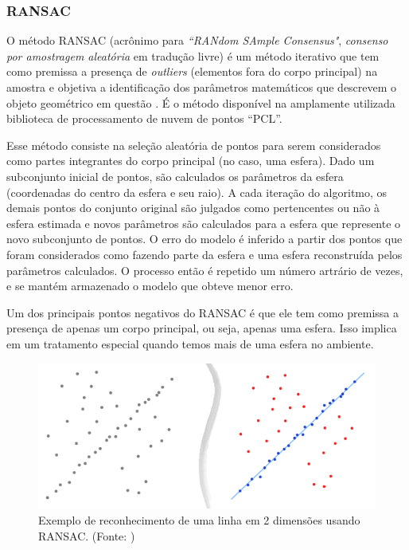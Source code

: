 \subsubsection{RANSAC}
O método RANSAC (acrônimo para \textit{``RANdom SAmple Consensus"},
\textit{consenso por amostragem aleatória} em tradução livre) é um método iterativo que tem como
premissa a presença de \textit{outliers} (elementos fora do corpo principal) na
amostra e objetiva a identificação dos parâmetros matemáticos que descrevem o
objeto geométrico em questão \cite{ransac}. É o método
disponível na amplamente utilizada biblioteca de processamento de nuvem de pontos ``PCL''. 


Esse método consiste na seleção aleatória de pontos para serem considerados como
partes integrantes do corpo principal (no caso, uma esfera). Dado um subconjunto
inicial de pontos, são calculados os parâmetros da esfera (coordenadas do centro
da esfera e seu raio). A cada iteração do algoritmo, os demais pontos do
conjunto original são julgados como pertencentes ou não à esfera estimada e
novos parâmetros são calculados para a esfera que represente o novo subconjunto
de pontos. O erro do modelo é inferido
a partir dos pontos que foram considerados como fazendo parte da esfera e uma esfera reconstruída pelos parâmetros calculados. O processo
então é repetido um número artrário de vezes, e se mantém armazenado o modelo
que obteve menor erro.

Um dos principais pontos negativos do RANSAC é que ele tem como premissa a
presença de apenas um corpo principal, ou seja, apenas uma esfera. Isso implica
em um tratamento especial quando temos mais de uma esfera no ambiente.

\begin{figure}[h!]
   \centering
   \includegraphics[width=0.9\columnwidth]{method/figs/calibracao/ransac}
   \caption{Exemplo de reconhecimento de uma linha em 2 dimensões usando
   RANSAC. (Fonte: \cite{ransac})}
   \label{fig::ransac}
\end{figure}
 
